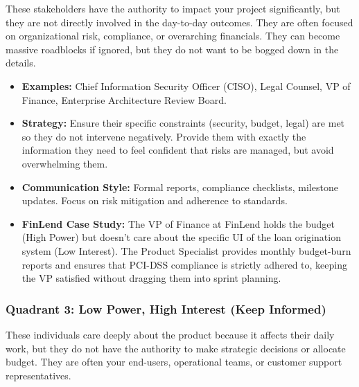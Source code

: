 \documentclass[
  11pt,
  openany,
  oneside]{book}
\providecommand{\tightlist}{%
  \setlength{\itemsep}{0pt}\setlength{\parskip}{0pt}}
\begin{document}
These stakeholders have the authority to impact your project
significantly, but they are not directly involved in the day-to-day
outcomes. They are often focused on organizational risk, compliance, or
overarching financials. They can become massive roadblocks if ignored,
but they do not want to be bogged down in the details.

\begin{itemize}
\tightlist
\item
  \textbf{Examples:} Chief Information Security Officer (CISO), Legal
  Counsel, VP of Finance, Enterprise Architecture Review Board.
\item
  \textbf{Strategy:} Ensure their specific constraints (security,
  budget, legal) are met so they do not intervene negatively. Provide
  them with exactly the information they need to feel confident that
  risks are managed, but avoid overwhelming them.
\item
  \textbf{Communication Style:} Formal reports, compliance checklists,
  milestone updates. Focus on risk mitigation and adherence to
  standards.
\item
  \textbf{FinLend Case Study:} The VP of Finance at FinLend holds the
  budget (High Power) but doesn't care about the specific UI of the loan
  origination system (Low Interest). The Product Specialist provides
  monthly budget-burn reports and ensures that PCI-DSS compliance is
  strictly adhered to, keeping the VP satisfied without dragging them
  into sprint planning.
\end{itemize}

\subsubsection{Quadrant 3: Low Power, High Interest (Keep
Informed)}\label{quadrant-3-low-power-high-interest-keep-informed}

These individuals care deeply about the product because it affects their
daily work, but they do not have the authority to make strategic
decisions or allocate budget. They are often your end-users, operational
teams, or customer support representatives.
\end{document}
